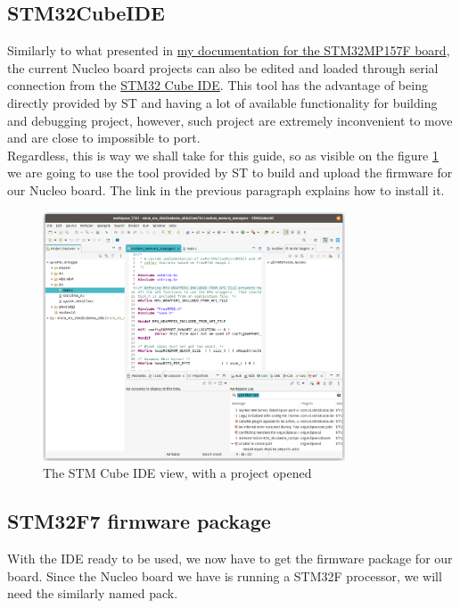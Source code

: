 \documentclass[10pt]{article}
\begin{document}
\subsection{STM32CubeIDE}
\label{sec:stm32cubeide}
Similarly to what presented in \href{https://gitlab.com/stm32mp157f-dk2/documentation}{my documentation for the STM32MP157F board}, the current Nucleo board projects can also be edited and loaded through serial connection from the \href{https://www.st.com/en/development-tools/stm32cubeide.html}{STM32 Cube IDE}. This tool has the advantage of being directly provided by ST and having a lot of available functionality for building and debugging project, however, such project are extremely inconvenient to move and are close to impossible to port.\\

Regardless, this is way we shall take for this guide, so as visible on the figure \ref{fig:ide} we are going to use the tool provided by ST to build and upload the firmware for our Nucleo board. The link in the previous paragraph explains how to install it.

\begin{figure}[h]
  \centering
  \includegraphics[width=0.8\textwidth]{./img/ide.png}
  \caption{The STM Cube IDE view, with a project opened}
  \label{fig:ide}
\end{figure}

\subsection{STM32F7 firmware package}
\label{sec:stm32f7-firmw-pack}
With the IDE ready to be used, we now have to get the firmware package for our board.
Since the Nucleo board we have is running a STM32F processor, we will need the similarly named pack.\\
\end{document}

